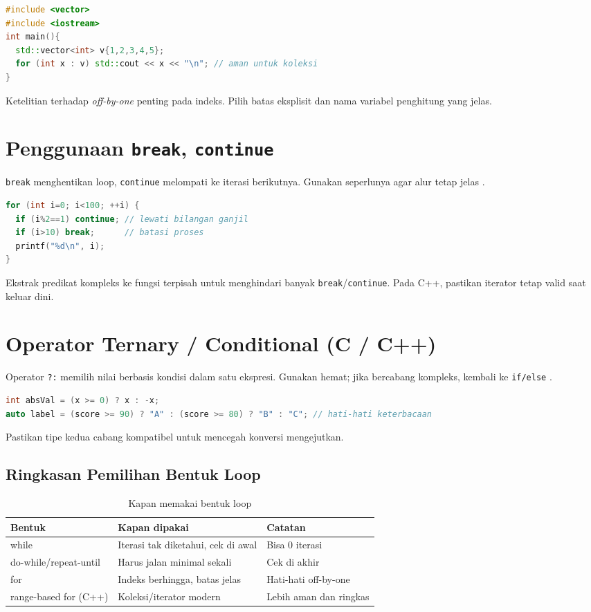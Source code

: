 \documentclass[../main.tex]{subfiles}
\begin{document}
\begin{lstlisting}[language=C++, caption={Range-based for (C++)}]
#include <vector>
#include <iostream>
int main(){
  std::vector<int> v{1,2,3,4,5};
  for (int x : v) std::cout << x << "\n"; // aman untuk koleksi
}
\end{lstlisting}

Ketelitian terhadap \emph{off-by-one} penting pada indeks. Pilih batas eksplisit dan nama variabel penghitung yang jelas.

\section{Penggunaan \texttt{break}, \texttt{continue}}
\texttt{break} menghentikan loop, \texttt{continue} melompati ke iterasi berikutnya. Gunakan seperlunya agar alur tetap jelas \parencite{gnu-c-manual,cpp-reference}.

\begin{lstlisting}[language=C, caption={break dan continue di C}]
for (int i=0; i<100; ++i) {
  if (i%2==1) continue; // lewati bilangan ganjil
  if (i>10) break;      // batasi proses
  printf("%d\n", i);
}
\end{lstlisting}

Ekstrak predikat kompleks ke fungsi terpisah untuk menghindari banyak \texttt{break}/\texttt{continue}. Pada C++, pastikan iterator tetap valid saat keluar dini.

\section{Operator Ternary / Conditional (C / C++)}
Operator \texttt{?:} memilih nilai berbasis kondisi dalam satu ekspresi. Gunakan hemat; jika bercabang kompleks, kembali ke \texttt{if/else} \parencite{cpp-reference}.

\begin{lstlisting}[language=C++]
int absVal = (x >= 0) ? x : -x;
auto label = (score >= 90) ? "A" : (score >= 80) ? "B" : "C"; // hati-hati keterbacaan
\end{lstlisting}

Pastikan tipe kedua cabang kompatibel untuk mencegah konversi mengejutkan.

\subsection{Ringkasan Pemilihan Bentuk Loop}
\begin{table}[h]
  \centering
  \caption{Kapan memakai bentuk loop}
  \begin{tabular}{@{}lll@{}}
    \toprule
    Bentuk & Kapan dipakai & Catatan \\
    \midrule
    while & Iterasi tak diketahui, cek di awal & Bisa 0 iterasi \\
    do-while/repeat-until & Harus jalan minimal sekali & Cek di akhir \\
    for & Indeks berhingga, batas jelas & Hati-hati off-by-one \\
    range-based for (C++) & Koleksi/iterator modern & Lebih aman dan ringkas \\
    \bottomrule
  \end{tabular}
\end{table}
\end{document}
